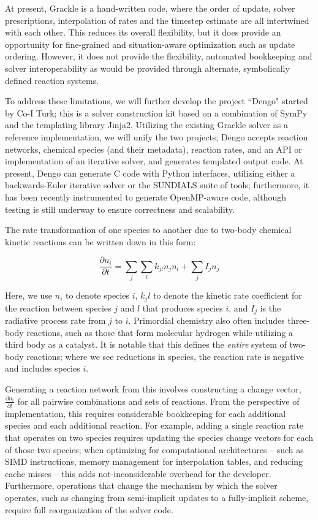 At present, Grackle is a hand-written code, where the order of update, solver
prescriptions, interpolation of rates and the timestep estimate are all
intertwined with each other.  This reduces its overall flexibility, but it does
provide an opportunity for fine-grained and situation-aware optimization such
as update ordering.  However, it does not provide the flexibility, automated
bookkeeping and solver interoperability as would be provided through alternate,
symbolically defined reaction systems.

To address these limitations, we will further develop the project ``Dengo"
started by Co-I Turk; this is a solver construction kit based on a combination
of SymPy and the templating library Jinja2.  Utilizing the existing Grackle
solver as a reference implementation, we will unify the two projects; Dengo
accepts reaction networks, chemical species (and their metadata), reaction
rates, and an API or implementation of an iterative solver, and generates
templated output code.  At present, Dengo can generate C code with Python
interfaces, utilizing either a backwards-Euler iterative solver or the SUNDIALS
suite of tools; furthermore, it has been recently instrumented to generate
OpenMP-aware code, although testing is still underway to ensure correctness and
scalability.




The rate transformation of one species to another due to two-body chemical kinetic
reactions can be written down in this form:

$$
\frac{\partial n_i }{\partial t} = \sum_{j}\sum_{l} k_{jl}n_{j}n_{l} + \sum_{j}I_{j}n_{j}
$$

Here, we use $n_{i}$ to denote species $i$, ${k_jl}$ to denote the kinetic rate
coefficient for the reaction between species $j$ and $l$ that produces species
$i$, and $I_{j}$ is the radiative process rate from $j$ to $i$.  Primordial
chemistry also often includes three-body reactions, such as those that
form molecular hydrogen while utilizing a third body as a catalyst.  It is
notable that this defines the \textit{entire} system of two-body reactions;
where we see reductions in species, the reaction rate is negative and includes
species ${i}$.


Generating a reaction network from this involves constructing a change vector,
$\frac{\partial n_i}{\partial t}$ for all pairwise combinations and sets of
reactions.  From the perspective of implementation, this requires considerable
bookkeeping for each additional species and each additional reaction.  For
example, adding a single reaction rate that operates on two species requires
updating the species change vectors for each of those two species; when
optimizing for computational architectures -- such as SIMD instructions, memory
management for interpolation tables, and reducing cache misses -- this adds
not-inconsiderable overhead for the developer.  Furthermore, operations that
change the mechanism by which the solver operates, such as changing from
semi-implicit updates to a fully-implicit scheme, require full reorganization
of the solver code.

